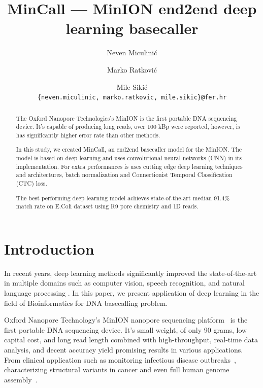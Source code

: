 \documentclass[runningheads,a4paper]{llncs}
\begin{document}
\frontmatter

\title{MinCall --- MinION end2end deep learning basecaller}
\author{Neven Miculinić \and Marko Ratković \and Mile Sikić\\
\texttt{\{neven.miculinic, marko.ratkovic, mile.sikic\}@fer.hr}}

\maketitle

\begin{abstract}
    The Oxford Nanopore Technologies's MinION is the first portable DNA sequencing device. It's capable of producing long reads, over 100 kBp were reported, however, is has significantly higher error rate than other methods.

    In this study, we created MinCall, an end2end basecaller model for the MinION. The model is based on deep learning and uses convolutional neural networks (CNN) in its implementation. For extra performances is uses cutting edge deep learning techniques and architectures, batch normalization and Connectionist Temporal Classification (CTC) loss.

    The best performing deep learning model achieves state-of-the-art median 91.4\% match rate on E.Coli dataset using R9 pore chemistry and 1D reads.
\end{abstract}

\section{Introduction}
In recent years, deep learning methods significantly improved the state-of-the-art in multiple domains such as computer vision, speech recognition, and natural language processing \cite{LeCun:1998:CNI:303568.303704}\cite{NIPS2012_4824}.
In this paper, we present application of deep learning in the field of  Bioinformatics for DNA basecalling problem.

Oxford Nanopore Technology's MinION nanopore sequencing platform~\cite{mikheyev2014first} is the first portable DNA sequencing device. It's small weight, of only 90 grams, low capital cost, and long read length combined with high-throughput, real-time data analysis, and decent accuracy yield promising results in various applications. From clinical application such as monitoring infectious disease outbreaks~\cite{judge2015early}\cite{quick2016real}, characterizing structural variants in cancer\cite{norris2016nanopore} and even full human genome assembly~\cite{jain2017nanopore}.
\end{document}
